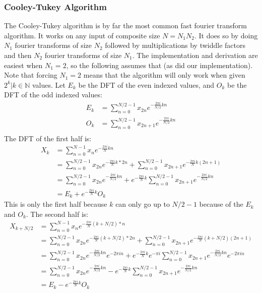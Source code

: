 \subsubsection{Cooley-Tukey Algorithm}
The Cooley-Tukey algorithm is by far the most common fast fourier transform algorithm. It works on any input of composite size $N=N_1N_2$. It does so by doing $N_1$ fourier transforms of size $N_2$ followed by multiplications by twiddle factors and then $N_2$ fourier transforms of size $N_1$. The implementation and derivation are easiest when $N_1=2$, so the following assumes that (as did our implementation). Note that forcing $N_1=2$ means that the algorithm will only work when given $2^k|k\in\mathbb{N}$ values. Let $E_k$ be the DFT of the even indexed values, and $O_k$ be the DFT of the odd indexed values:
\begin{align*}
	E_k &= \sum_{n=0}^{N/2-1}x_{2n}e^{-\frac{2\pi i}{N/2}kn} \\
	O_k &= \sum_{n=0}^{N/2-1}x_{2n+1}e^{-\frac{2\pi i}{N/2}kn}\\
\end{align*}
The DFT of the first half is:\\
\begin{align*}
	X_k &= \sum_{n=0}^{N-1}x_ne^{-\frac{2\pi i}{N}kn} \\
	&=\sum_{n=0}^{N/2-1}x_{2n}e^{-\frac{2\pi i}{N}k*2n} + \sum_{n=0}^{N/2-1}x_{2n+1}e^{-\frac{2\pi i}{N}k(2n+1)} \\
	&=\sum_{n=0}^{N/2-1}x_{2n}e^{-\frac{2\pi i}{N/2}kn} + e^{-\frac{2\pi i}{N}k}\sum_{n=0}^{N/2-1}x_{2n+1}e^{-\frac{2\pi i}{N/2}kn} \\
	&=E_k+e^{-\frac{2\pi i}{N}k}O_k
\end{align*}
This is only the first half because $k$ can only go up to $N/2-1$ because of the $E_k$ and $O_k$. The second half is:\\
\begin{align*}
	X_{k+N/2} &= \sum_{n=0}^{N-1}x_ne^{-\frac{2\pi i}{N}(k+N/2)*n} \\
	&=\sum_{n=0}^{N/2-1}x_{2n}e^{-\frac{2\pi i}{N}(k+N/2)*2n} + \sum_{n=0}^{N/2-1}x_{2n+1}e^{-\frac{2\pi i}{N}(k+N/2)(2n+1)} \\
	&=\sum_{n=0}^{N/2-1}x_{2n}e^{-\frac{2\pi i}{N/2}kn}e^{-2\pi in} + e^{-\frac{2\pi i}{N}k}e^{-\pi i} \sum_{n=0}^{N/2-1}x_{2n+1}e^{-\frac{2\pi i}{N/2}kn}e^{-2\pi in} \\
	&=\sum_{n=0}^{N/2-1}x_{2n}e^{-\frac{2\pi i}{N/2}kn} - e^{-\frac{2\pi i}{N}k}\sum_{n=0}^{N/2-1}x_{2n+1}e^{-\frac{2\pi i}{N/2}kn} \\
	&=E_k-e^{-\frac{2\pi i}{N}k}O_k
\end{align*}
